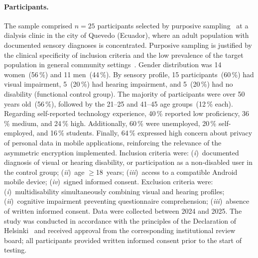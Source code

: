 \documentclass[journal]{IEEEtran}
\begin{document}
	\paragraph{Participants.}
	The sample comprised $n{=}25$ participants selected by
	purposive sampling~\cite{hernandez2014} at a dialysis clinic
	in the city of Quevedo (Ecuador), where an adult population
	with documented sensory diagnoses is concentrated.
	Purposive sampling is justified by the clinical specificity
	of inclusion criteria and the low prevalence of the target
	population in general community settings~\cite{who2011}.
	Gender distribution was 14 women~(56\,\%) and 11 men~(44\,\%).
	By sensory profile, 15 participants~(60\,\%) had visual
	impairment, 5~(20\,\%) had hearing impairment, and 5~(20\,\%)
	had no disability (functional control group).
	The majority of participants were over 50 years old~(56\,\%),
	followed by the 21--25 and 41--45 age groups~(12\,\% each).
	Regarding self-reported technology experience, 40\,\% reported
	low proficiency, 36\,\% medium, and 24\,\% high.
	Additionally, 60\,\% were unemployed, 20\,\% self-employed,
	and 16\,\% students.
	Finally, 64\,\% expressed high concern about privacy of
	personal data in mobile applications, reinforcing the relevance
	of the asymmetric encryption implemented.
	Inclusion criteria were:
	(\textit{i})~documented diagnosis of visual or hearing
	disability, or participation as a non-disabled user in the
	control group;
	(\textit{ii})~age $\geq$18~years;
	(\textit{iii})~access to a compatible Android mobile device;
	(\textit{iv})~signed informed consent.
	Exclusion criteria were:
	(\textit{i})~multidisability simultaneously combining visual
	and hearing profiles;
	(\textit{ii})~cognitive impairment preventing questionnaire
	comprehension;
	(\textit{iii})~absence of written informed consent.
	Data were collected between 2024 and 2025.
	The study was conducted in accordance with the principles of
	the Declaration of Helsinki~\cite{world2013} and received
	approval from the corresponding institutional review board;
	all participants provided written informed consent prior to
	the start of testing.
	
\end{document}
